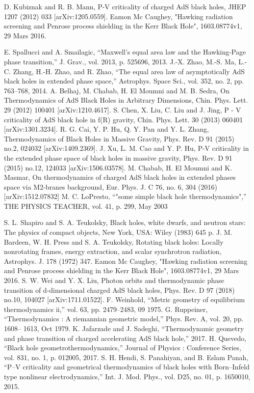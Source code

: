 \documentclass[12pt,  a4paper, openright]{report} %
\begin{document}
\begin{thebibliography}{99}
 D. Kubiznak and R. B. Mann, P-V criticality of charged AdS black holes, JHEP 1207 (2012) 033
[arXiv:1205.0559].
 Eamon Mc Caughey, "Hawking radiation screening and Penrose process shielding in the Kerr Black Hole", 1603.08774v1, 29 Mars 2016.

 E. Spallucci and A. Smailagic, “Maxwell’s equal area law and the Hawking-Page phase transition,”
J. Grav., vol. 2013, p. 525696, 2013.
 J.-X. Zhao, M.-S. Ma, L.-C. Zhang, H.-H. Zhao, and R. Zhao, “The equal area law of asymptotically
AdS black holes in extended phase space,” Astrophys. Space Sci., vol. 352, no. 2, pp. 763–768, 2014.
 A. Belhaj, M. Chabab, H. El Moumni and M. B. Sedra, On Thermodynamics of AdS Black Holes in
Arbitrary Dimensions, Chin. Phys. Lett. 29 (2012) 100401 [arXiv:1210.4617].
  S. Chen, X. Liu, C. Liu and J. Jing, P - V criticality of AdS black hole in f(R) gravity, Chin. Phys.
Lett. 30 (2013) 060401 [arXiv:1301.3234].
 R. G. Cai, Y. P. Hu, Q. Y. Pan and Y. L. Zhang, Thermodynamics of Black Holes in Massive Gravity,
Phys. Rev. D 91 (2015) no.2, 024032 [arXiv:1409.2369].
 J. Xu, L. M. Cao and Y. P. Hu, P-V criticality in the extended phase space of black holes in massive
gravity, Phys. Rev. D 91 (2015) no.12, 124033 [arXiv:1506.03578].
 M. Chabab, H. El Moumni and K. Masmar, On thermodynamics of charged AdS black holes
in extended phases space via M2-branes background, Eur. Phys. J. C 76, no. 6, 304 (2016)
[arXiv:1512.07832]
 M. C. LoPresto, “"some simple black hole thermodynamics",” THE PHYSICS TEACHER, vol. 41,
p. 299, May 2003


  S. L. Shapiro and S. A. Teukolsky, Black holes, white dwarfs, and neutron stars: The physics of
compact objects, New York, USA: Wiley (1983) 645 p.
 J. M. Bardeen, W. H. Press and S. A. Teukolsky, Rotating black holes: Locally nonrotating frames,
energy extraction, and scalar synchrotron radiation, Astrophys. J. 178 (1972) 347. 
 Eamon Mc Caughey, "Hawking radiation screening and Penrose process shielding
in the Kerr Black Hole", 1603.08774v1, 29 Mars 2016.
 S. W. Wei and Y. X. Liu, Photon orbits and thermodynamic phase transition of d-dimensional charged
AdS black holes, Phys. Rev. D 97 (2018) no.10, 104027 [arXiv:1711.01522].
 F. Weinhold, “Metric geometry of equilibrium thermodynamics ii,” vol. 63, pp. 2479–2483, 09 1975.
 G. Ruppeiner, “Thermodynamics : A riemannian geometric model,” Phys. Rev. A, vol. 20, pp. 1608–
1613, Oct 1979.
 K. Jafarzade and J. Sadeghi, “Thermodynamic geometry and phase transition of charged accelerating
AdS black hole,” 2017.
 H. Quevedo, “Black hole geometrothermodynamics,” Journal of Physics : Conference Series, vol. 831,
no. 1, p. 012005, 2017.
 S. H. Hendi, S. Panahiyan, and B. Eslam Panah, “P–V criticality and geometrical thermodynamics
of black holes with Born–Infeld type nonlinear electrodynamics,” Int. J. Mod. Phys., vol. D25, no. 01,
p. 1650010, 2015.
\end{thebibliography}

\appendix

\end{document}
